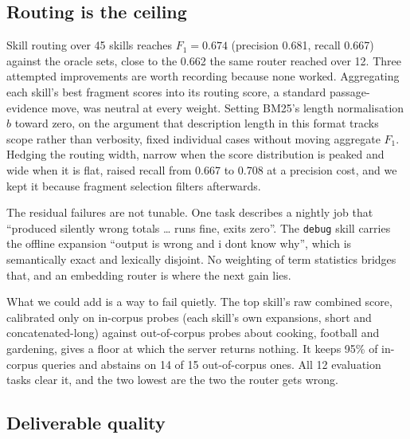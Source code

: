 \documentclass[11pt]{article}
\begin{document}
\subsection{Routing is the ceiling}

Skill routing over 45 skills reaches $F_1 = 0.674$ (precision 0.681, recall 0.667) against the
oracle sets, close to the 0.662 the same router reached over 12. Three attempted improvements are
worth recording because none worked. Aggregating each skill's best fragment scores into its routing
score, a standard passage-evidence move, was neutral at every weight. Setting BM25's length
normalisation $b$ toward zero, on the argument that description length in this format tracks scope
rather than verbosity, fixed individual cases without moving aggregate $F_1$. Hedging the routing
width, narrow when the score distribution is peaked and wide when it is flat, raised recall from
0.667 to 0.708 at a precision cost, and we kept it because fragment selection filters afterwards.

The residual failures are not tunable. One task describes a nightly job that ``produced silently
wrong totals \dots{} runs fine, exits zero''. The \texttt{debug} skill carries the offline expansion
``output is wrong and i dont know why'', which is semantically exact and lexically disjoint. No
weighting of term statistics bridges that, and an embedding router is where the next gain lies.

What we could add is a way to fail quietly. The top skill's raw combined score, calibrated only on
in-corpus probes (each skill's own expansions, short and concatenated-long) against out-of-corpus
probes about cooking, football and gardening, gives a floor at which the server returns nothing. It
keeps 95\% of in-corpus queries and abstains on 14 of 15 out-of-corpus ones. All 12 evaluation tasks
clear it, and the two lowest are the two the router gets wrong.

\subsection{Deliverable quality}
\end{document}

